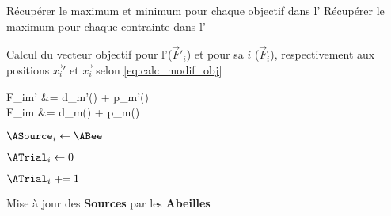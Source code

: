 \begin{algorithm}\label{alg:maj_phase}
  \SetAlgoVlined
  \DontPrintSemicolon
  Récupérer le maximum et minimum pour chaque objectif dans l’\AHive\;
  Récupérer le maximum pour chaque contrainte dans l’\AHive\;
  \For{$\ABee \in \ABees$}
  {
    Calcul du vecteur objectif pour l’\ABee ($\vec{F}'_{i}$) et pour sa \ASource $i$ ($\vec{F}_{i}$),
    respectivement aux positions $\vec{x_{i}}'$ et $\vec{x_{i}}$
    selon \eqref{eq:calc_modif_obj}\;
    {
      \begin{algomathdisplay}
      \begin{aligned}
      F_{im}' &= d_{m}'() + p_{m}'() \\
      F_{im}  &= d_{m}() + p_{m}()   \\
      \end{aligned}
      \end{algomathdisplay}
    }
    {

      $\ASource_{i} \leftarrow \ABee$ 

      $\ATrial_{i} \leftarrow 0$ 
    }
    \Else
    {
      $\ATrial_{i} \pluseq 1$ 
    }
  }
  \caption{Mise à jour des \textbf{Sources} par les \textbf{Abeilles}}
\end{algorithm}

